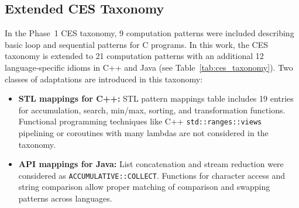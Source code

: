 \subsection{Extended CES Taxonomy}
\label{subsec:ces_taxonomy}
In the Phase~1 CES taxonomy, 9 computation patterns were included describing basic loop and sequential patterns for C programs. In this work, the CES taxonomy is extended to 21 computation patterns with an additional 12 language-specific idioms in C++ and Java (see Table~\ref{tab:ces_taxonomy}). Two classes of adaptations are introduced in this taxonomy:
\begin{itemize}
    \item \textbf{STL mappings for C++:} STL pattern mappings table includes 19 entries for accumulation, search, min/max, sorting, and transformation functions. Functional programming techniques like C++ \texttt{std::ranges::views} pipelining or coroutines with many lambdas are not considered in the taxonomy.
    \item \textbf{API mappings for Java:} List concatenation and stream reduction were considered as \texttt{ACCUMULATIVE::COLLECT}. Functions for character access and string comparison allow proper matching of comparison and swapping patterns across languages.
\end{itemize}

